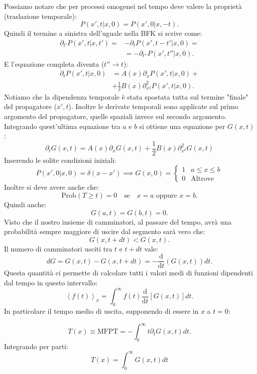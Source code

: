 Possiamo notare che per processi omogenei nel tempo deve valere la proprietà (traslazione temporale):
\[
    P\left(x',t|x,0\right) = P\left(x',0|x, -t\right) 
.\] 
Quindi il termine a sinistra dell'uguale nella BFK si scrive come:
\[\begin{aligned}
    \partial_{t'}P\left(x',t|x,t'\right) =& -\partial_{t}P(x',t-t'|x,0) = \\
					  & = -\partial_{t''}P\left(x',t''|x,0\right)
.\end{aligned}\]
E l'equazione completa diventa ($t''\to t$):
\[\begin{aligned}
    \partial_{t}P\left(x',t|x,0\right) &= A(x) \partial_{x}P\left(x',t|x,0\right) + \\
				       & + \frac{1}{2}B(x) \partial^2_{x^2}P\left(x',t|x,0\right)
.\end{aligned}\]
Notiamo che la dipendenza temporale è stata spostata tutta sul termine "finale" del propagatore ($x',t$). Inoltre le derivate temporali sono applicate sul primo argomento del propagatore, quelle spaziali invece sul secondo argomento.\\
Integrando quest'ultima equazione tra $a$ e $b$ si ottiene una equazione per $G(x,t)$:
\begin{equation}
    \partial_{t}G(x,t) = A(x) \partial_{x}G(x,t) + \frac{1}{2}B(x) \partial^2_{x^2}G(x,t) 
    \label{eq:11_G_diff}
\end{equation}
Inserendo le solite condizioni iniziali: 
\[
    P(x',0|x,0) = \delta (x-x') \implies 
    G(x,0) = 
    \begin{cases}
	1 & a\le x\le b\\
	0 &\text{Altrove}
    \end{cases}
\] 
Inoltre si deve avere anche che:
\[
    \text{Prob}(T\ge t) = 0 \quad \text{se} \quad x = a \text{ oppure } x = b
.\] 
Quindi anche:
\[
    G(a,t) = G(b,t) = 0
.\] 
Visto che il nostro insieme di camminatori, al passare del tempo, avrà una probabilità sempre maggiore di uscire dal segmento sarà vero che:
\[
    G(x, t+dt) < G(x,t)
.\] 
Il numero di camminatori usciti tra $t$ e $t+dt$ vale:
\[
    dG = G(x,t)-G(x,t+dt) = -\frac{\text{d} }{\text{d} t}(G(x,t)) dt
.\] 
Questa quantità ci permette di calcolare tutti i valori medi di funzioni dipendenti dal tempo in questo intervallo:
\[
    \left<f(t) \right>_x = \int_{0}^{\infty} f(t) \frac{\text{d} }{\text{d} t} \left[G(x,t) \right]dt 
.\] 
In particolare il tempo medio di uscita, supponendo di essere in $x$  a $t=0$:
\begin{redbox}{}
\[
    T(x) \equiv \text{MFPT} = - \int_{0}^{\infty} t \partial_{t}G(x,t) dt 
.\]   
Integrando per parti:
\begin{equation}
    T(x) = \int_{0}^{\infty} G(x,t) dt 
    \label{eq:11_MFPT}
\end{equation}
\end{redbox}
